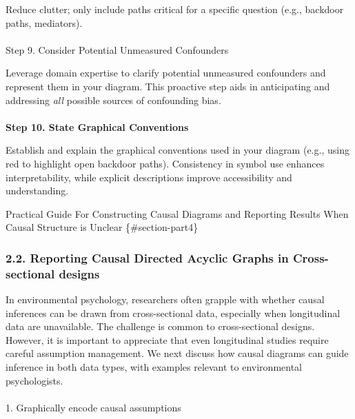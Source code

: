 \documentclass[
  single column]{article}
\makeatletter
\let\oldparagraph\paragraph
\renewcommand{\paragraph}{
    \@ifstar
      \xxxParagraphStar
      \xxxParagraphNoStar
  }
\newcommand{\xxxParagraphStar}[1]{\oldparagraph*{#1}\mbox{}}
\newcommand{\xxxParagraphNoStar}[1]{\oldparagraph{#1}\mbox{}}
\makeatother
\begin{document}
Reduce clutter; only include paths critical for a specific question
(e.g., backdoor paths, mediators).

\paragraph{Step 9. Consider Potential Unmeasured
Confounders}\label{step-9.-consider-potential-unmeasured-confounders}

Leverage domain expertise to clarify potential unmeasured confounders
and represent them in your diagram. This proactive step aids in
anticipating and addressing \emph{all} possible sources of confounding
bias.

\paragraph{\texorpdfstring{\textbf{Step 10. State Graphical
Conventions}}{Step 10. State Graphical Conventions}}\label{step-10.-state-graphical-conventions}

Establish and explain the graphical conventions used in your diagram
(e.g., using red to highlight open backdoor paths). Consistency in
symbol use enhances interpretability, while explicit descriptions
improve accessibility and understanding.

Practical Guide For Constructing Causal Diagrams and Reporting Results
When Causal Structure is Unclear \{\#section-part4\}

\subsubsection{2.2. Reporting Causal Directed Acyclic Graphs in
Cross-sectional
designs}\label{reporting-causal-directed-acyclic-graphs-in-cross-sectional-designs}

In environmental psychology, researchers often grapple with whether
causal inferences can be drawn from cross-sectional data, especially
when longitudinal data are unavailable. The challenge is common to
cross-sectional designs. However, it is important to appreciate that
even longitudinal studies require careful assumption management. We next
discuss how causal diagrams can guide inference in both data types, with
examples relevant to environmental psychologists.

\paragraph{1. Graphically encode causal
assumptions}\label{graphically-encode-causal-assumptions}
\end{document}
